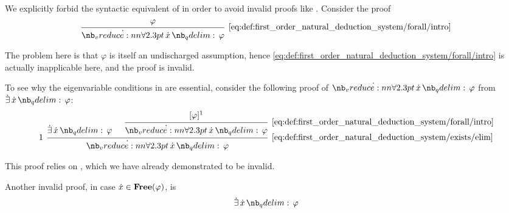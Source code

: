 \begin{example}\label{ex:def:first_order_natural_deduction_system/eigenvariables}
  \hfill
  \begin{thmenum}
     We explicitly forbid the syntactic equivalent of  in order to avoid invalid proofs like . Consider the proof
    \begin{equation*}
      \begin{prooftree}
        \hypo{ \varphi }
        \infer1[\ref{eq:def:first_order_natural_deduction_system/forall/intro}]{ \qforall \synx \varphi }
      \end{prooftree}
    \end{equation*}

    The problem here is that \( \varphi \) is itself an undischarged assumption, hence \eqref{eq:def:first_order_natural_deduction_system/forall/intro} is actually inapplicable here, and the proof is invalid.

     To see why the eigenvariable conditions in  are essential, consider the following proof of \( \qforall \synx \varphi \) from \( \qexists \synx \varphi \):
    \begin{equation*}
      \begin{prooftree}
        \hypo{ \qexists \synx \varphi }

        \hypo{ [\varphi]^1 }
        \infer1[\ref{eq:def:first_order_natural_deduction_system/forall/intro}]{ \qforall \synx \varphi }

        \infer[left label=\( 1 \)]2[\ref{eq:def:first_order_natural_deduction_system/exists/elim}]{ \qforall \synx \varphi }
      \end{prooftree}
    \end{equation*}

    This proof relies on , which we have already demonstrated to be invalid.

     Another invalid proof, in case \( \synx \in \op*{Free}(\varphi) \), is
    \begin{equation*}
      \begin{prooftree}
        \hypo{ \qexists \synx \varphi }


\end{prooftree}
\end{equation*}
\end{thmenum}
\end{example}
